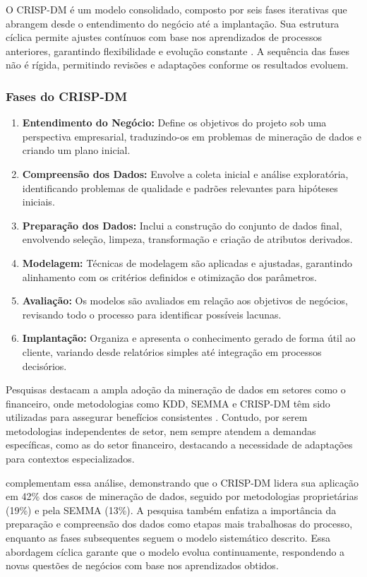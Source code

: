 \documentclass[12pt,a4paper]{article}
\begin{document}
O CRISP-DM é um modelo consolidado, composto por seis fases iterativas que abrangem desde o entendimento do negócio até a implantação. Sua estrutura cíclica permite ajustes contínuos com base nos aprendizados de processos anteriores, garantindo flexibilidade e evolução constante \cite{brzozowska2023}. A sequência das fases não é rígida, permitindo revisões e adaptações conforme os resultados evoluem.

\subsubsection{Fases do CRISP-DM}

\begin{enumerate}
    \item \textbf{Entendimento do Negócio:} Define os objetivos do projeto sob uma perspectiva empresarial, traduzindo-os em problemas de mineração de dados e criando um plano inicial.
    \item \textbf{Compreensão dos Dados:} Envolve a coleta inicial e análise exploratória, identificando problemas de qualidade e padrões relevantes para hipóteses iniciais.
    \item \textbf{Preparação dos Dados:} Inclui a construção do conjunto de dados final, envolvendo seleção, limpeza, transformação e criação de atributos derivados.
    \item \textbf{Modelagem:} Técnicas de modelagem são aplicadas e ajustadas, garantindo alinhamento com os critérios definidos e otimização dos parâmetros.
    \item \textbf{Avaliação:} Os modelos são avaliados em relação aos objetivos de negócios, revisando todo o processo para identificar possíveis lacunas.
    \item \textbf{Implantação:} Organiza e apresenta o conhecimento gerado de forma útil ao cliente, variando desde relatórios simples até integração em processos decisórios.
\end{enumerate}

Pesquisas destacam a ampla adoção da mineração de dados em setores como o financeiro, onde metodologias como KDD, SEMMA e CRISP-DM têm sido utilizadas para assegurar benefícios consistentes \cite{plotnikova2022}. Contudo, por serem metodologias independentes de setor, nem sempre atendem a demandas específicas, como as do setor financeiro, destacando a necessidade de adaptações para contextos especializados.

\cite{brzozowska2023} complementam essa análise, demonstrando que o CRISP-DM lidera sua aplicação em 42\% dos casos de mineração de dados, seguido por metodologias proprietárias (19\%) e pela SEMMA (13\%). A pesquisa também enfatiza a importância da preparação e compreensão dos dados como etapas mais trabalhosas do processo, enquanto as fases subsequentes seguem o modelo sistemático descrito. Essa abordagem cíclica garante que o modelo evolua continuamente, respondendo a novas questões de negócios com base nos aprendizados obtidos.
\end{document}
